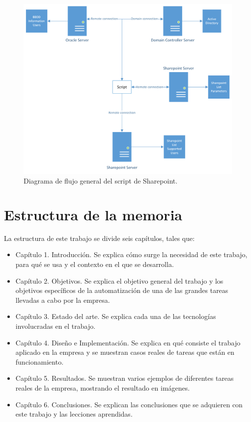 \documentclass[a4paper, 12pt]{book}
\begin{document}
\begin{figure}[H]
	\centering
	\includegraphics[width=17cm, keepaspectratio]{img/Sharepoint_diagrama.png}
	\caption{Diagrama de flujo general del script de Sharepoint.}
	\label{fig:Sharepoint_diagrama}
\end{figure}

\section{Estructura de la memoria}
\label{sec:estructura}

La estructura de este trabajo se divide seis capítulos, tales que:

\begin{itemize}
\item Capítulo 1. Introducción.
Se explica cómo surge la necesidad de este trabajo, para qué se usa y el contexto en el que se desarrolla.

\item Capítulo 2. Objetivos.
Se explica el objetivo general del trabajo y los objetivos específicos de la automatización de una de las grandes tareas llevadas a cabo por la empresa.

\item Capítulo 3. Estado del arte.
Se explica cada una de las tecnologías involucradas en el trabajo.

\item Capítulo 4. Diseño e Implementación.
Se explica en qué consiste el trabajo aplicado en la empresa y se muestran casos reales de tareas que están en funcionamiento.

\item Capítulo 5. Resultados.
Se muestran varios ejemplos de diferentes tareas reales de la empresa, mostrando el resultado en imágenes.

\item Capítulo 6. Conclusiones.
Se explican las conclusiones que se adquieren con este trabajo y las lecciones aprendidas.

\end{itemize}
\end{document}
